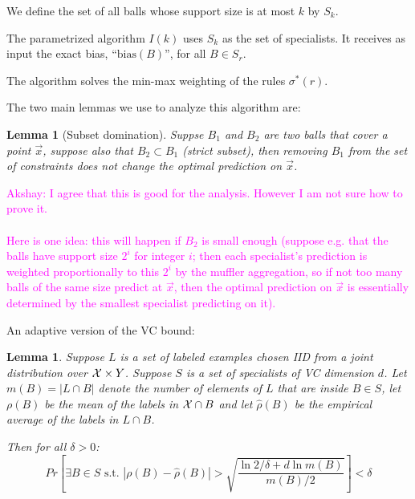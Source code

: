 \documentclass{article}
\newtheorem{lemma}[theorem]{Lemma}
\newcommand{\X}{{\cal X}}
\newcommand{\x}{\vec{x}}
\newcommand{\emprho}{\hat{\rho}}
\newcommand{\bias}{\text{bias}}
\newcommand{\akshay}[1]{\textcolor{magenta}{Akshay: #1}}
\begin{document}
We define the set of all balls whose support size is at most $k$ by $S_k$.

The parametrized algorithm $I(k)$ uses $S_k$ as the set of specialists. 
It receives as input the exact bias, ``$\bias(B)$'', for all $B \in S_r$.

The algorithm solves the min-max weighting of the rules $\sigma^*(r)$.

The two main lemmas we use to analyze this algorithm are:
\begin{lemma}[Subset domination]
  Suppse $B_1$ and $B_2$ are two balls that cover a point $\x$,
  suppose also that $B_2 \subset B_1$ (strict subset), then
  removing $B_1$ from the set of constraints does not change the
  optimal prediction on $\x$.
\end{lemma}

\akshay{I agree that this is good for the analysis. However I am not sure how to prove it. \\ \\
Here is one idea: this will happen if $B_2$ is small enough (suppose e.g. 
that the balls have support size $2^i$ for integer $i$; then each specialist's prediction is  
weighted proportionally to this $2^i$ by the muffler aggregation, 
so if not too many balls of the same size predict at $\x$, 
then the optimal prediction on $\x$ is essentially determined by the smallest specialist predicting on it). 
}

An adaptive version of the VC bound:
\begin{lemma}
Suppose $L$ is a set of labeled examples chosen IID from a
joint distribution over $\X \times Y$. Suppose $S$ is a set of
specialists of VC dimension $d$.
Let $m(B)=|L \cap B|$ denote the number of elements of $L$ that are
inside $B \in S$, let $\rho(B)$ be the mean of the labels in $\X \cap B$ and
let $\emprho(B)$ be the empirical average of the labels in $L \cap B$. 

Then for all $\delta>0$:
$$
Pr\left[ \exists B\in S \text{ s.t. }  |\rho(B) - \emprho(B)| >
  \sqrt{\frac{\ln 2/\delta+d \ln m(B)}{m(B)/2}} \right] < \delta
$$
\end{lemma}
\end{document}
